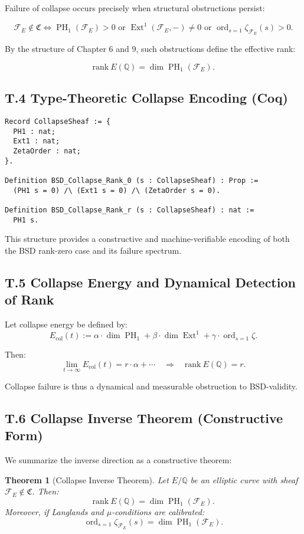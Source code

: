 \documentclass[11pt]{article}
\newtheorem{theorem}{Theorem}[section]
\DeclareMathOperator{\Ext}{Ext}
\DeclareMathOperator{\PH}{PH}
\newcommand{\ord}{\operatorname{ord}}
\begin{document}
Failure of collapse occurs precisely when structural obstructions persist:

\[
\mathcal{F}_E \notin \mathfrak{C} \iff \PH_1(\mathcal{F}_E) > 0 \text{ or } \Ext^1(\mathcal{F}_E, -) \neq 0 \text{ or } \ord_{s=1} \zeta_{\mathcal{F}_E}(s) > 0.
\]

By the structure of Chapter 6 and 9, such obstructions define the effective rank:

\[
\mathrm{rank}~E(\mathbb{Q}) = \dim \PH_1(\mathcal{F}_E).
\]

\subsection*{T.4 Type-Theoretic Collapse Encoding (Coq)}
\begin{lstlisting}[language=Coq]
Record CollapseSheaf := {
  PH1 : nat;
  Ext1 : nat;
  ZetaOrder : nat;
}.

Definition BSD_Collapse_Rank_0 (s : CollapseSheaf) : Prop :=
  (PH1 s = 0) /\ (Ext1 s = 0) /\ (ZetaOrder s = 0).

Definition BSD_Collapse_Rank_r (s : CollapseSheaf) : nat :=
  PH1 s.
\end{lstlisting}

This structure provides a constructive and machine-verifiable encoding of both the BSD rank-zero case and its failure spectrum.

\subsection*{T.5 Collapse Energy and Dynamical Detection of Rank}

Let collapse energy be defined by:
\[
E_{\mathrm{col}}(t) := \alpha \cdot \dim \PH_1 + \beta \cdot \dim \Ext^1 + \gamma \cdot \ord_{s=1} \zeta.
\]

Then:
\[
\lim_{t \to \infty} E_{\mathrm{col}}(t) = r \cdot \alpha + \cdots \quad \Rightarrow \quad \mathrm{rank}~E(\mathbb{Q}) = r.
\]

Collapse failure is thus a dynamical and measurable obstruction to BSD-validity.

\subsection*{T.6 Collapse Inverse Theorem (Constructive Form)}

We summarize the inverse direction as a constructive theorem:

\begin{theorem}[Collapse Inverse Theorem]
\label{thm:collapse-inverse}
Let \( E/\mathbb{Q} \) be an elliptic curve with sheaf \( \mathcal{F}_E \notin \mathfrak{C} \). Then:
\[
\mathrm{rank}~E(\mathbb{Q}) = \dim \PH_1(\mathcal{F}_E).
\]
Moreover, if Langlands and \( \mu \)-conditions are calibrated:
\[
\ord_{s=1} \zeta_{\mathcal{F}_E}(s) = \dim \PH_1(\mathcal{F}_E).
\]
\end{theorem}
\end{document}
